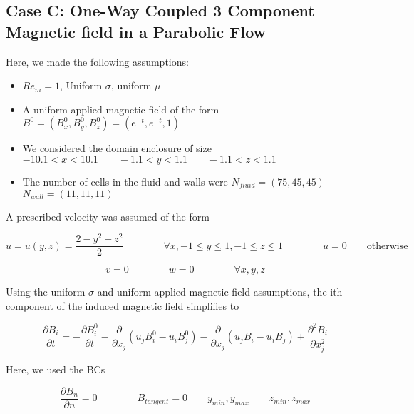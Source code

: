 \documentclass[11pt]{article}
\newcommand{\figS}{22.1em}
\newcommand{\figH}{\figS}
\newcommand{\figW}{\figS}
\begin{document}
\begin{figure}[H]
 \centering
   \caption[Optional ]{}
\end{figure}


\subsection{Case C: One-Way Coupled 3 Component Magnetic field in a Parabolic Flow}

Here, we made the following assumptions:

\begin{itemize}
\item $Re_m = 1$, Uniform $\sigma$, uniform $\mu$
\item A uniform applied magnetic field of the form $B^0 = (B_x^0,B_y^0,B_z^0) = (e^{-t},e^{-t},1)$
\item We considered the domain enclosure of size $-10.1 < x < 10.1 \qquad -1.1 < y < 1.1 \qquad -1.1 < z < 1.1$
\item The number of cells in the fluid and walls were $N_{fluid} = (75,45,45)$ \qquad $N_{wall} = (11,11,11)$
\end{itemize}

A prescribed velocity was assumed of the form

\begin{equation}
	u
	=
	u(y,z)
	= \frac{2 - y^2 - z^2}{2}
	\qquad \qquad
	\forall x
	,
	-1 \le y \le 1
	,
	-1 \le z \le 1
	\qquad \qquad
	u = 0 
	\qquad
	\text{otherwise}
\end{equation}

\begin{equation}
	v = 0
	\qquad \qquad
	w = 0
	\qquad \qquad
	\forall x,y,z
\end{equation}


Using the uniform $\sigma$ and uniform applied magnetic field assumptions, the ith component of the induced magnetic field simplifies to

\begin{equation}
	\frac{\partial B_i}{\partial t} 
	=
	-
	\frac{\partial B_i^0}{\partial t}
	-
	\frac{\partial}{\partial x_j} (u_j B_i^0 - u_i B_j^0) 
	-
	\frac{\partial}{\partial x_j} (u_j B_i - u_i B_j) 
	+
	\frac{\partial^2 B_i}{\partial x_j^2} 
\end{equation}

Here, we used the BCs

\begin{equation}
	\frac{\partial B_{n}}{\partial n} = 0
	\qquad \qquad
	B_{tangent} = 0
	\qquad
	y_{min}, y_{max}
	\qquad
	z_{min}, z_{max}
\end{equation}
\end{document}
